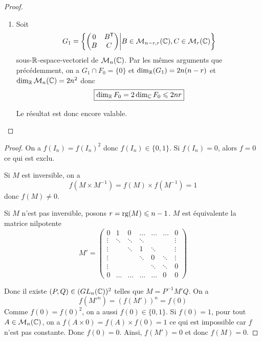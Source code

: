 \documentclass[12pt]{article}
\begin{document}
\begin{proof}
\begin{enumerate}
        \item Soit 
        \begin{equation}
            G_{1}=\left\lbrace\begin{pmatrix}
                0 & B^{\mathsf{T}}\\
                B & C
            \end{pmatrix}\middle| B\in\mathcal{M}_{n-r,r}(\mathbb{C}),C\in\mathcal{M}_{r}(\mathbb{C})\right\rbrace
        \end{equation}
        sous-$\mathbb{R}$-espace-vectoriel de $\mathcal{M}_{n}(\mathbb{C})$. Par les mêmes arguments que précédemment, on a $G_{1}\cap F_{0}=\lbrace0\rbrace$ et $\dim_{\mathbb{R}}(G_{1})=2n(n-r)$ et $\dim_{\mathbb{R}}\mathcal{M}_{n}(\mathbb{C})=2n^{2}$ donc 
        \begin{equation}
            \boxed{\dim_{\mathbb{R}}F_{0}=2\dim_{\mathbb{C}}F_{0}\leqslant 2nr}
        \end{equation}

        Le résultat est donc encore valable.
    \end{enumerate}
\end{proof}

\begin{proof}
    On a $f(I_{n})=f(I_{n})^{2}$ donc $f(I_{n})\in\lbrace0,1\rbrace$. Si $f(I_{n})=0$, alors $f=0$ ce qui est exclu.

    Si $M$ est inversible, on a 
    \begin{equation}
        f(M\times M^{-1})=f(M)\times f(M^{-1})=1
    \end{equation}
    donc $f(M)\neq0$.

    Si $M$ n'est pas inversible, posons $r=\operatorname{rg}(M)\leqslant n-1$. $M$ est équivalente la matrice nilpotente
    \begin{equation}
        M'=
        \begin{pmatrix}
            0 & 1 & 0 &\dots & \dots&\dots & 0\\
            \vdots & \ddots & \ddots & \ddots& & &\vdots\\
            \vdots & &\ddots & 1 & \ddots &&\vdots\\
            \vdots & && \ddots & 0 &\ddots &\vdots\\
            \vdots & & & &\ddots & \ddots & 0\\
            0 &\dots & \dots & \dots & \dots &0&0
        \end{pmatrix}
    \end{equation}

    Donc il existe $(P,Q)\in (GL_{n}(\mathbb{C}))^{2}$ telles que $M=P^{-1}M'Q$. On a
    \begin{equation}
        f(M'^{n})=\left(f(M')\right)^{n}=f(0)
    \end{equation}
    Comme $f(0)=f(0)^{2}$, on a aussi $f(0)\in\lbrace0,1\rbrace$. Si $f(0)=1$, pour tout $A\in\mathcal{M}_{n}(\mathbb{C})$, on a $f(A\times 0)=f(A)\times f(0)=1$ ce qui est impossible car $f$ n'est pas constante. Donc $f(0)=0$. Ainsi, $f(M')=0$ et donc $f(M)=0$.
\end{proof}
\end{document}
